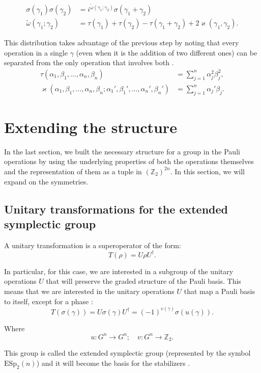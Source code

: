 \begin{align*}
  \sigma(\gamma_1)\sigma(\gamma_2) &= i^{\tilde{\omega}(\gamma_1; \gamma_2)} \sigma(\gamma_1 + \gamma_2)\\
  \tilde{\omega} (\gamma_1; \gamma_2) &= \tau(\gamma_1) + \tau(\gamma_2) - \tau(\gamma_1 + \gamma_2) + 2\varkappa(\gamma_1, \gamma_2)
.\end{align*}

This distribution takes advantage of the previous step by noting that every operation in a single $\gamma$ (even when it is the addition of two different ones) can be separated from the only operation that involves both \citep{Cesar2024}.
\begin{align*}
  \tau(\alpha_1, \beta_1, \ldots, \alpha_n, \beta_n) &= \sum_{j = 1}^n \alpha_j^2 \beta_j^2,\\
  \varkappa(\alpha_1, \beta_1, \ldots, \alpha_n, \beta_n; \alpha_1', \beta_1', \ldots, \alpha_n', \beta_n') &= \sum_{j = 1}^n \alpha_j' \beta_j
.\end{align*}

\section{Extending the structure}

In the last section, we built the necessary structure for a group in the Pauli operations by using the underlying properties of both the operations themselves and the representation of them as a tuple in $(\mathbb{Z}_2)^{2n}$. In this section, we will expand on the symmetries.

\subsection{Unitary transformations for the extended symplectic group}

\begin{definition}
  A unitary transformation is a superoperator of the form:
  \begin{equation}
    T(\rho) = U \rho U^\dagger
  .\end{equation}

  In particular, for this case, we are interested in a subgroup of the unitary operations $U$ that will preserve the graded structure of the Pauli basis. This means that we are interested in the unitary operations $U$ that map a Pauli basis to itself, except for a phase \citep{Kitaev2002}:
  \begin{equation}
    T (\sigma(\gamma)) = U \sigma(\gamma) U^\dagger = (-1)^{v(\gamma)}\sigma(u(\gamma))
    \label{eq:symplectic}
  .\end{equation}

  Where
  \begin{equation}
    u : G^n \to G^n;\quad v : G^n \to \mathbb{Z}_2
  .\end{equation}

  This group is called the extended symplectic group (represented by the symbol $\text{ESp}_2(n)$) and it will become the basis for the stabilizers \citep{Kitaev2002}.
\end{definition}

